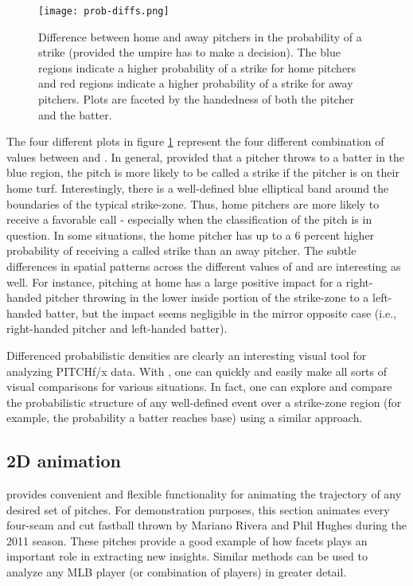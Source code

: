 \begin{article}
\begin{figure}[h]
\centerline{\texttt{[image: prob-diffs.png]}}

\caption{\label{fig:diff-probs}Difference between home and away pitchers in
the probability of a strike (provided the umpire has to make a decision).
The blue regions indicate a higher probability of a strike for home
pitchers and red regions indicate a higher probability of a strike
for away pitchers. Plots are faceted by the handedness of both the
pitcher and the batter.}
\end{figure}


The four different plots in figure \ref{fig:diff-probs} represent
the four different combination of values between 
and . In general, provided that a pitcher throws to a
batter in the blue region, the pitch is more likely to be called a
strike if the pitcher is on their home turf. Interestingly, there
is a well-defined blue elliptical band around the boundaries of the
typical strike-zone. Thus, home pitchers are more likely to receive
a favorable call - especially when the classification of the pitch
is in question. In some situations, the home pitcher has up to a 6
percent higher probability of receiving a called strike than an away
pitcher. The subtle differences in spatial patterns across the different
values of  and  are interesting as well.
For instance, pitching at home has a large positive impact for a right-handed
pitcher throwing in the lower inside portion of the strike-zone to
a left-handed batter, but the impact seems negligible in the mirror
opposite case (i.e., right-handed pitcher and left-handed batter).

Differenced probabilistic densities are clearly an interesting visual
tool for analyzing PITCHf/x data. With , one can quickly
and easily make all sorts of visual comparisons for various situations.
In fact, one can explore and compare the probabilistic structure of
any well-defined event over a strike-zone region (for example, the
probability a batter reaches base) using a similar approach. 


\subsection{2D animation}

 provides convenient and flexible functionality for
animating the trajectory of any desired set of pitches. For demonstration
purposes, this section animates every four-seam and cut fastball thrown
by Mariano Rivera and Phil Hughes during the 2011 season. These pitches
provide a good example of how facets plays an important role in extracting
new insights. Similar methods can be used to analyze any MLB player
(or combination of players) in greater detail.


\end{article}
